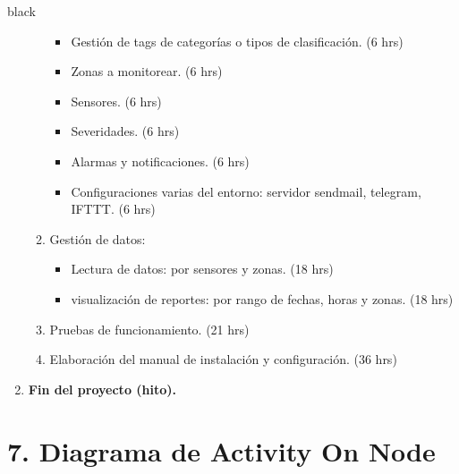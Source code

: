 \documentclass[11pt]{charter}
\begin{document}
\begin{consigna}{black}
\begin{enumerate}
\begin{enumerate}
\begin{itemize}
				\item Gestión de tags de categorías o tipos de clasificación. (6 hrs) 
				\item Zonas a monitorear. (6 hrs) 
				\item Sensores. (6 hrs)
 				\item Severidades. (6 hrs)
				\item Alarmas y notificaciones. (6 hrs) 
				\item Configuraciones varias del entorno: servidor sendmail, telegram, IFTTT. (6 hrs)
			\end{itemize}
		\item Gestión de datos:
			\begin{itemize}
				\item Lectura de datos: por sensores y zonas. (18 hrs) 
				\item visualización de reportes: por rango de fechas, horas y zonas. (18 hrs) 
			\end{itemize}
		\item Pruebas de funcionamiento. (21 hrs) 
		\item Elaboración del manual de instalación y configuración. (36 hrs)  	
	\end{enumerate}
\item  \textbf{Fin del proyecto (hito).}	
\end{enumerate}



\end{consigna}



\newpage
{}
\addtolength{\oddsidemargin}{-.875in}
\vspace*{2px}

\section{7. Diagrama de Activity On Node}
\label{sec:AoN}
\end{document}
